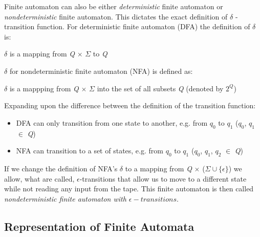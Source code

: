 Finite automaton can also be either \textit{deterministic} finite automaton or \textit{nondeterministic} finite automaton. This dictates the exact definition of $\delta$ - transition function.
For deterministic finite automaton (DFA) the definition of $\delta$ is:\\
\centerline{$\delta$ is a mapping from \textit{Q} $\times$ $\Sigma$ to \textit{Q}}
$\delta$ for nondeterministic finite automaton (NFA) is defined as:\\
\centerline{$\delta$ is a mappping from \textit{Q} $\times$ $\Sigma$ into the set of all subsets \textit{Q} (denoted by $2^\textit{Q}$)}
Expanding upon the difference between the definition of the transition function:
\begin{itemize}
    \item DFA can only transition from one state to another, e.g. from $\textit{q}_0$ to $\textit{q}_1$ ($\textit{q}_0$, $\textit{q}_1$ $\in$ \textit{Q})
    \item NFA can transition to a set of states, e.g. from $\textit{q}_0$ to $\textit{q}_1$ ($\textit{q}_0$, $\textit{q}_1$, $\textit{q}_2$ $\in$ \textit{Q})
\end{itemize}
If we change the definition of NFA's $\delta$ to a mapping from \textit{Q} $\times$ ($\Sigma \cup \{\epsilon\}$) we allow, what are called, $\epsilon$-transitions that allow us to move to a different state while not reading any input from the tape. This finite automaton is then called \textit{nondeterministic finite automaton with $\epsilon-transitions$}.

\subsection{Representation of Finite Automata}

